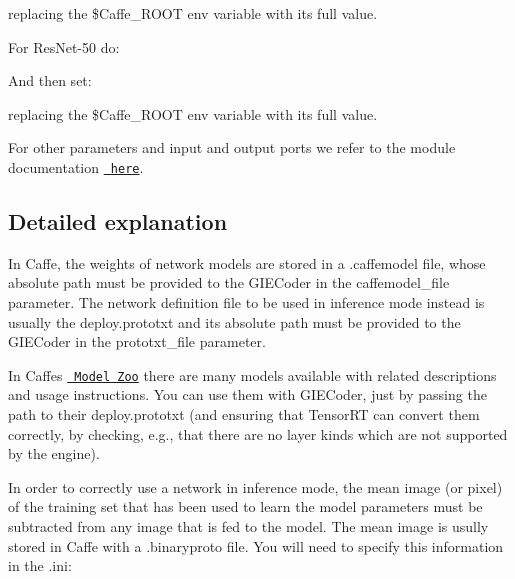 replacing the {\ttfamily \$\+Caffe\+\_\+\+R\+O\+OT} env variable with its full value.

For {\ttfamily Res\+Net-\/50} do\+:


\begin{DoxyCode}{0}
\end{DoxyCode}


And then set\+:


\begin{DoxyCode}{0}
\end{DoxyCode}


replacing the {\ttfamily \$\+Caffe\+\_\+\+R\+O\+OT} env variable with its full value.

For other parameters and input and output ports we refer to the module documentation \href{http://robotology.github.io/himrep/doxygen/doc/html/group__GIECoder.html}{\texttt{ here}}.

\subsection*{Detailed explanation}

In Caffe, the weights of network models are stored in a {\ttfamily .caffemodel} file, whose absolute path must be provided to the {\ttfamily G\+I\+E\+Coder} in the {\ttfamily caffemodel\+\_\+file} parameter. The network definition file to be used in inference mode instead is usually the {\ttfamily deploy.\+prototxt} and its absolute path must be provided to the {\ttfamily G\+I\+E\+Coder} in the {\ttfamily prototxt\+\_\+file} parameter.

In Caffe\textquotesingle{}s \href{http://caffe.berkeleyvision.org/model_zoo.html}{\texttt{ Model Zoo}} there are many models available with related descriptions and usage instructions. You can use them with {\ttfamily G\+I\+E\+Coder}, just by passing the path to their {\ttfamily deploy.\+prototxt} (and ensuring that Tensor\+RT can convert them correctly, by checking, e.\+g., that there are no layer kinds which are not supported by the engine).

In order to correctly use a network in inference mode, the mean image (or pixel) of the training set that has been used to learn the model parameters must be subtracted from any image that is fed to the model. The mean image is usully stored in Caffe with a {\ttfamily .binaryproto} file. You will need to specify this information in the {\ttfamily .ini}\+:


